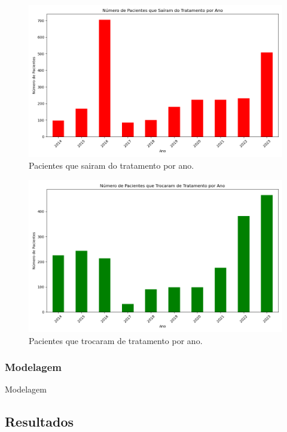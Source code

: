 \documentclass[article,a4paper,12pt,brazil,sumario=tradicional]{abntex2}
\begin{document}
\begin{figure}[!ht]
    \centering
    \includegraphics[width=1\textwidth]{pacientes_sairam_tratamento_por_ano.png}
    \caption{Pacientes que sairam do tratamento por ano.}
    \label{fig:pacientes_sairam_tratamento_por_ano}
\end{figure}

\begin{figure}[!ht]
    \centering
    \includegraphics[width=1\textwidth]{pacientes_troca_tratamento_por_ano.png}
    \caption{Pacientes que trocaram de tratamento por ano.}
    \label{fig:pacientes_troca_tratamento_por_ano}
\end{figure}

\subsubsection{Modelagem}

Modelagem

\subsection{Resultados}
\end{document}
